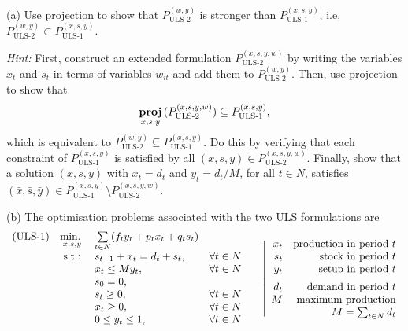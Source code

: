 \vspace{5pt}

(a) Use projection to show that $P_{\text{ULS-2}}^{(w,y)}$ is stronger than $P_{\text{ULS-1}}^{(x,s,y)}$, i.e, $P_{\text{ULS-2}}^{(w,y)} \subset P_{\text{ULS-1}}^{(x,s,y)}$.

\emph{Hint:} 
First, construct an extended formulation $P_{\text{ULS-2}}^{(x,s,y,w)}$ by writing the variables $x_t$ and $s_t$ in terms of variables $w_{it}$ and add them to $P_{\text{ULS-2}}^{(w,y)}$. Then, use projection to show that 
\begin{equation*}
\mathop{\bf proj}_{x,s,y}\,(P_{\text{ULS-2}}^{(x,s,y,w)}) \subseteq P_{\text{ULS-1}}^{(x,s,y)},
\end{equation*} 
which is equivalent to $P_{\text{ULS-2}}^{(w,y)} \subseteq P_{\text{ULS-1}}^{(x,s,y)}$. Do this by verifying that each constraint of $P_{\text{ULS-1}}^{(x,s,y)}$ is satisfied by all $(x,s,y)\in P_{\text{ULS-2}}^{(x,s,y,w)}$. Finally, show that a solution $(\bar{x},\bar{s},\bar{y})$ with $\bar{x}_t = d_t$ and \lb $\bar{y}_t = d_t/M$, for all $t \in N$, satisfies $(\bar{x},\bar{s},\bar{y}) \in P_{\text{ULS-1}}^{(x,s,y)} \setminus P_{\text{ULS-2}}^{(x,s,y,w)}$.

\vspace{5pt}

(b) The optimisation problems associated with the two ULS formulations are
\begin{align*}
	\begin{array}{lrlr}
		\text{(ULS-1)} & \mathop{\text{min.~}}\limits_{x,s,y} & \sum\limits_{t\in N} (f_ty_t + p_tx_t + q_ts_t)\\
		         & \mathop{\text{s.t.:~}}  & s_{t-1} + x_t = d_t + s_t, & \forall t\in N\\
		    	 &      & x_t  \leq M y_t, 		  & \forall t\in N\\
		    	 &      & s_0 = 0, 			      & 			  \\
		    	 &      & s_t \geq 0, 			  & \forall t\in N\\
		    	 &      & x_t \geq 0, 			  & \forall t\in N\\
		    	 &      & 0 \leq y_{t} \leq 1, 	  & \forall t\in N
	 \end{array}
	 \quad~\left|
	 \begin{array}{rr}
	  	x_t  & \text{production in period } t\\
	    s_t  & \text{stock in period }      t\\
	    y_t  & \text{setup in period }      t\\[5pt]
	    d_t  & \text{demand in period }     t\\
	    M    & \text{maximum production}\\
	         & M = \sum_{t\in N}d_t
	 \end{array}\right.
\end{align*}\\[-30pt]

